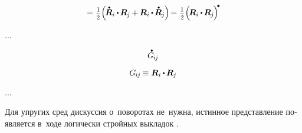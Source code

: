 \begin{multline*}
{= \hspace{.1ex} \smalldisplaystyleonehalf \hspace{-0.33ex} \left( \hspace{-0.25ex} \mathdotabove{\bm{R}}_i \hspace{-0.1ex} \dotp \hspace{-0.15ex} \bm{R}_{\hspace{-0.1ex}j} \hspace{-0.1ex} + \hspace{-0.1ex} \bm{R}_i \hspace{-0.1ex} \dotp \hspace{-0.15ex} \mathdotabove{\bm{R}}_{\hspace{-0.1ex}j} \hspace{-0.1ex} \right) \hspace{-0.3ex}
= \hspace{.1ex} \smalldisplaystyleonehalf \hspace{-0.33ex} \left(^{\mathstrut} \hspace{-0.4ex}
\bm{R}_i \hspace{-0.1ex} \dotp \hspace{-0.15ex} \bm{R}_{\hspace{-0.1ex}j}
\hspace{-0.2ex} \right)^{\hspace{-0.3ex}\tikz[baseline=-0.5ex]\draw[black, fill=black] (0,0) circle (.266ex);}
}
\end{multline*}

...

\[
\mathdotabove{G}_{\hspace{-0.15ex}i\hspace{-0.1ex}j}
\]

\[
G_{\hspace{-0.15ex}i\hspace{-0.1ex}j} \hspace{-0.2ex} \equiv
\bm{R}_i \hspace{-0.1ex} \dotp \hspace{-0.15ex} \bm{R}_{\hspace{-0.1ex}j}
\]

\begin{otherlanguage}{russian}

...

Для упругих сред дискуссия о~поворотах не~нужна, истинное представление появляется в~ходе логически стройных выкладок .

\end{otherlanguage}


